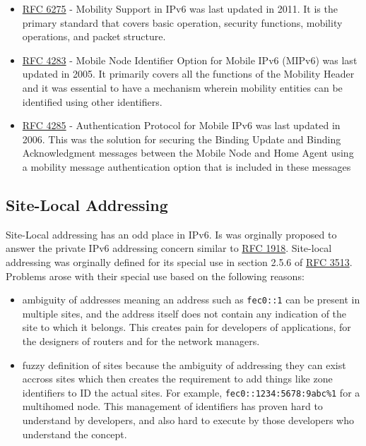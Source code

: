 \documentclass[
]{article}
\providecommand{\tightlist}{%
  \setlength{\itemsep}{0pt}\setlength{\parskip}{0pt}}
\begin{document}
\begin{itemize}
\tightlist
\item
  \href{https://www.rfc-editor.org/rfc/rfc6275.html}{RFC 6275} -
  Mobility Support in IPv6 was last updated in 2011. It is the primary
  standard that covers basic operation, security functions, mobility
  operations, and packet structure.
\item
  \href{https://www.rfc-editor.org/rfc/rfc4283.html}{RFC 4283} - Mobile
  Node Identifier Option for Mobile IPv6 (MIPv6) was last updated in
  2005. It primarily covers all the functions of the Mobility Header and
  it was essential to have a mechanism wherein mobility entities can be
  identified using other identifiers.
\item
  \href{https://www.rfc-editor.org/rfc/rfc4285.html}{RFC 4285} -
  Authentication Protocol for Mobile IPv6 was last updated in 2006. This
  was the solution for securing the Binding Update and Binding
  Acknowledgment messages between the Mobile Node and Home Agent using a
  mobility message authentication option that is included in these
  messages
\end{itemize}

\subsection{Site-Local Addressing}\label{site-local-addressing}

Site-Local addressing has an odd place in IPv6. Is was orginally
proposed to answer the private IPv6 addressing concern similar to
\href{https://www.rfc-editor.org/rfc/rfc1918.html}{RFC 1918}. Site-local
addressing was orginally defined for its special use in section 2.5.6 of
\href{https://www.rfc-editor.org/rfc/rfc3513.html\#section-2.5.6}{RFC
3513}. Problems arose with their special use based on the following
reasons:

\begin{itemize}
\tightlist
\item
  ambiguity of addresses meaning an address such as \texttt{fec0::1} can
  be present in multiple sites, and the address itself does not contain
  any indication of the site to which it belongs. This creates pain for
  developers of applications, for the designers of routers and for the
  network managers.
\item
  fuzzy definition of sites because the ambiguity of addressing they can
  exist accross sites which then creates the requirement to add things
  like zone identifiers to ID the actual sites. For example,
  \texttt{fec0::1234:5678:9abc\%1} for a multihomed node. This
  management of identifiers has proven hard to understand by developers,
  and also hard to execute by those developers who understand the
  concept.
\end{itemize}
\end{document}
